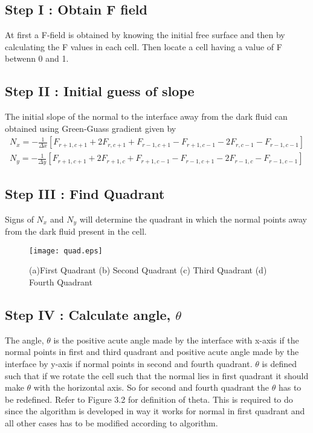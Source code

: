 \subsection{Step I : Obtain F field}
At first a F-field is obtained by knowing the initial free surface and then by calculating the F values in each cell. Then locate a cell having a value of F betwenn 0 and 1.

\subsection{Step II : Initial guess of slope}
The initial slope of the normal to the interface away from the dark fluid can obtained using Green-Guass gradient given by 
\begin{eqnarray}
  N_x=-\frac{1}{\Delta x}{[F_{r+1,c+1}+2F_{r,c+1}+F_{r-1,c+1}-F_{r+1,c-1}-2F_{r,c-1}-F_{r-1,c-1}]} \\
  N_y=-\frac{1}{\Delta y}{[F_{r+1,c+1}+2F_{r+1,c}+F_{r+1,c-1}-F_{r-1,c+1}-2F_{r-1,c}-F_{r-1,c-1}]}
\end{eqnarray}

\subsection{Step III : Find Quadrant}

  Signs of $N_x$ and $N_y$ will determine the quadrant in which the normal points away from the dark fluid present in the cell.
  \begin{figure}[H]
  \centering
   \texttt{[image: quad.eps]}
   \caption[Interface normal direction]{(a)First Quadrant (b) Second Quadrant (c) Third Quadrant (d) Fourth Quadrant }
  \end{figure}

\subsection{Step IV : Calculate angle, $\theta$}
 The angle, $\theta$ is the positive acute angle made by the interface with x-axis if the normal points in first and third quadrant and positive acute angle made by 
 the interface by y-axis if normal points in second and fourth quadrant. $\theta$ is defined such that if we rotate the cell such that the normal lies in first quadrant
 it should make $\theta$ with the horizontal axis. So for second and fourth quadrant the $\theta$ has to be redefined. Refer to Figure 3.2 for definition of theta. This is 
 required to do since the algorithm is developed in way it works for normal in first quadrant and all other cases has to be modified according to algorithm.
 
